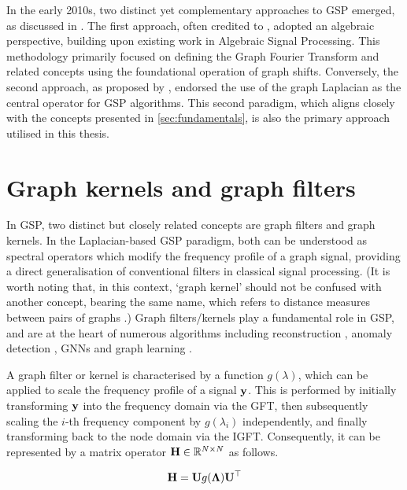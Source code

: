 In the early 2010s, two distinct yet complementary approaches to GSP emerged, as discussed in \cite{Leus2023}. The first approach, often credited to \cite{Sandryhaila2013, Sandryhaila2013b}, adopted an algebraic perspective, building upon existing work in Algebraic Signal Processing. This methodology primarily focused on defining the Graph Fourier Transform and related concepts using the foundational operation of graph shifts. Conversely, the second approach, as proposed by  \cite{Hammond2011, Shuman2013}, endorsed the use of the graph Laplacian as the central operator for GSP algorithms. This second paradigm, which aligns closely with the concepts presented in \cref{sec:fundamentals}, is also the primary approach utilised in this thesis.


\section{Graph kernels and graph filters}

\label{sec:graph_kernels}

In GSP, two distinct but closely related concepts are graph filters and graph kernels. In the Laplacian-based GSP paradigm, both can be understood as spectral operators which modify the frequency profile of a graph signal, providing a direct generalisation of conventional filters in classical signal processing. (It is worth noting that, in this context, `graph kernel' should not be confused with another concept, bearing the same name, which refers to distance measures between pairs of graphs \citep{Kriege2020}.) Graph filters/kernels play a fundamental role in GSP, and are at the heart of numerous algorithms including reconstruction \citep{Romero2017b}, anomaly detection \citep{Xiao2021}, GNNs \citep{Gama2020} and graph learning \citep{Mateos2019}. 

A graph filter or kernel is characterised by a function $g(\lambda)$, which can be applied to scale the frequency profile of a signal $\mathbf{y}$. This is performed by initially transforming $\mathbf{y}$ into the frequency domain via the GFT, then subsequently scaling the $i$-th frequency component by $g(\lambda_i)$ independently, and finally transforming back to the node domain via the IGFT. Consequently, it can be represented by a matrix operator $\mathbf{H} \in \mathbb{R}^{N \times N}$ as follows.

\begin{equation}
    \mathbf{H}  = \mathbf{U} g(\mathbf{\Lambda}) \mathbf{U}^\top 
\end{equation}

